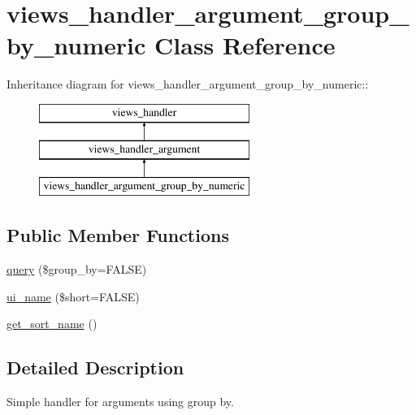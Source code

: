 \hypertarget{classviews__handler__argument__group__by__numeric}{
\section{views\_\-handler\_\-argument\_\-group\_\-by\_\-numeric Class Reference}
\label{classviews__handler__argument__group__by__numeric}
}
Inheritance diagram for views\_\-handler\_\-argument\_\-group\_\-by\_\-numeric::\begin{figure}[H]
\begin{center}
\leavevmode
\includegraphics[height=3cm]{classviews__handler__argument__group__by__numeric}
\end{center}
\end{figure}
\subsection*{Public Member Functions}
\begin{DoxyCompactItemize}
\item 
\hyperlink{classviews__handler__argument__group__by__numeric_ae17513cfe9036aba188964ef9982852b}{query} (\$group\_\-by=FALSE)
\item 
\hyperlink{classviews__handler__argument__group__by__numeric_aad9d8a9bd1b787224b8f811997c9d8eb}{ui\_\-name} (\$short=FALSE)
\item 
\hyperlink{classviews__handler__argument__group__by__numeric_aa0d331fb229f454fcc8e55d63b6a61fc}{get\_\-sort\_\-name} ()
\end{DoxyCompactItemize}


\subsection{Detailed Description}
Simple handler for arguments using group by. 

